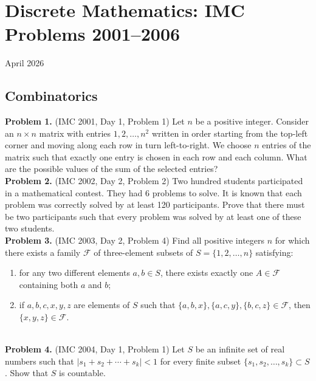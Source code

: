 \documentclass{article}
\begin{document}
\pagestyle{plain}

\section*{Discrete Mathematics: IMC Problems 2001--2006}

\begin{center}
April 2026
\end{center}

\subsection*{Combinatorics}

\textbf{Problem 1.} (IMC 2001, Day 1, Problem 1)
Let \( n \) be a positive integer. Consider an \( n \times n \) matrix with entries \( 1, 2, \ldots, n^2 \) written in order starting from the top-left corner and moving along each row in turn left-to-right. We choose \( n \) entries of the matrix such that exactly one entry is chosen in each row and each column. What are the possible values of the sum of the selected entries?
\\

\textbf{Problem 2.} (IMC 2002, Day 2, Problem 2)
Two hundred students participated in a mathematical contest. They had 6 problems to solve. It is known that each problem was correctly solved by at least 120 participants. Prove that there must be two participants such that every problem was solved by at least one of these two students.
\\

\textbf{Problem 3.} (IMC 2003, Day 2, Problem 4)
Find all positive integers \( n \) for which there exists a family \( \mathcal{F} \) of three-element subsets of \( S = \{1, 2, \ldots, n\} \) satisfying:
\begin{enumerate}
    \item for any two different elements \( a, b \in S \), there exists exactly one \( A \in \mathcal{F} \) containing both \( a \) and \( b \);
    \item if \( a, b, c, x, y, z \) are elements of \( S \) such that \( \{a, b, x\}, \{a, c, y\}, \{b, c, z\} \in \mathcal{F} \), then \( \{x, y, z\} \in \mathcal{F} \).
\end{enumerate}
\\

\textbf{Problem 4.} (IMC 2004, Day 1, Problem 1)
Let \( S \) be an infinite set of real numbers such that \( |s_1 + s_2 + \cdots + s_k| < 1 \) for every finite subset \( \{s_1, s_2, \ldots, s_k\} \subset S \). Show that \( S \) is countable.
\\
\end{document}
